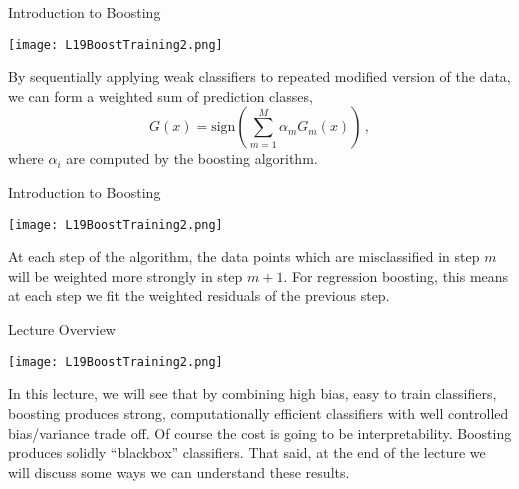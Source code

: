 \documentclass[10pt, table, dvipsnames,xcdraw, handout]{beamer}
\begin{document}
\begin{frame}[fragile]{Introduction to Boosting}
  \begin{minipage}[t][0.5\textheight][t]{\textwidth}
	\centering \texttt{[image: L19BoostTraining2.png]} 
  \end{minipage}
  \vfill
\begin{minipage}[t][0.5\textheight][t]{\textwidth}
By sequentially applying weak classifiers to repeated modified version of the data, we can form a weighted sum of prediction classes,
$$
G(x) = \text{sign}\left( \sum_{m=1}^M\alpha_mG_m(x) \right)\,,
$$
where $\alpha_i$ are computed by the boosting algorithm.
\end{minipage}
\end{frame}



\begin{frame}[fragile]{Introduction to Boosting}
  \begin{minipage}[t][0.5\textheight][t]{\textwidth}
	\centering \texttt{[image: L19BoostTraining2.png]} 
  \end{minipage}
  \vfill
\begin{minipage}[t][0.5\textheight][t]{\textwidth}
At each step of the algorithm, the data points which are misclassified in step $m$ will be weighted more strongly in step $m+1$. \pause For regression boosting, this means at each step we fit the weighted residuals of the previous step. 
\end{minipage}
\end{frame}



\begin{frame}[fragile]{Lecture Overview}
  \begin{minipage}[t][0.5\textheight][t]{\textwidth}
	\centering \texttt{[image: L19BoostTraining2.png]} 
  \end{minipage}
  \vfill
\begin{minipage}[t][0.5\textheight][t]{\textwidth}
In this lecture, we will see that by combining high bias, easy to train classifiers, boosting produces strong, computationally efficient classifiers with well controlled bias/variance trade off. \pause Of course the cost is going to be interpretability. Boosting produces solidly ``blackbox'' classifiers. That said, at the end of the lecture we will discuss some ways we can understand these results. 
\end{minipage}
\end{frame}
\end{document}
